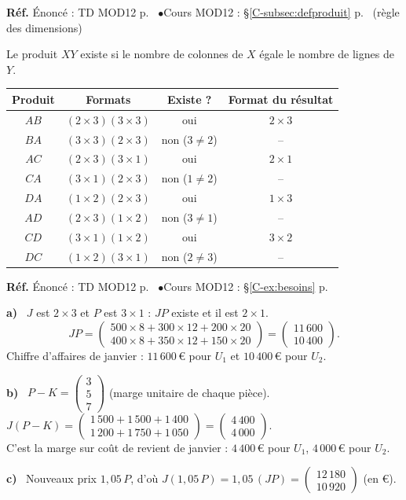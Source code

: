 \documentclass[a4paper,11pt]{article}
\newcommand{\M}[1]{\begin{pmatrix}#1\end{pmatrix}}
\newcommand{\cours}[1]{§\ref{C-#1} p.~\pageref{C-#1}}
\newcommand{\source}[2]{{\footnotesize\color{uimmgray}\textbf{Réf.} \enspace Énoncé : TD MOD12 p.~\pageref{T-#1} \enspace$\bullet$\enspace Cours MOD12 : #2}\par\smallskip}
\newcommand{\q}[1]{\textbf{\color{uimmblue}#1}\ }
\begin{document}
\begin{correction}
\source{exo:4}{\cours{subsec:defproduit} (règle des dimensions)}
Le produit $XY$ existe si le nombre de colonnes de $X$ égale le nombre de lignes de $Y$.
\begin{center}
\renewcommand{\arraystretch}{1.3}
\begin{tabular}{|c|c|c|c|}
\hline
\rowcolor{uimmlightblue}
Produit & Formats & Existe ? & Format du résultat \\
\hline
$AB$ & $(2\times 3)(3\times 3)$ & oui & $2\times 3$ \\
$BA$ & $(3\times 3)(2\times 3)$ & non ($3\neq 2$) & -- \\
$AC$ & $(2\times 3)(3\times 1)$ & oui & $2\times 1$ \\
$CA$ & $(3\times 1)(2\times 3)$ & non ($1\neq 2$) & -- \\
$DA$ & $(1\times 2)(2\times 3)$ & oui & $1\times 3$ \\
$AD$ & $(2\times 3)(1\times 2)$ & non ($3\neq 1$) & -- \\
$CD$ & $(3\times 1)(1\times 2)$ & oui & $3\times 2$ \\
$DC$ & $(1\times 2)(3\times 1)$ & non ($2\neq 3$) & -- \\
\hline
\end{tabular}
\end{center}
\end{correction}

\begin{correction}
\source{exo:5}{\cours{ex:besoins}}
\q{a)} $J$ est $2\times 3$ et $P$ est $3\times 1$ : $JP$ existe et il est $2\times 1$.
\[
JP = \M{500\times 8 + 300\times 12 + 200\times 20\\ 400\times 8 + 350\times 12 + 150\times 20} = \M{11\,600\\ 10\,400}.
\]
Chiffre d'affaires de janvier : $11\,600$\,€ pour $U_1$ et $10\,400$\,€ pour $U_2$.

\q{b)} $P - K = \M{3\\5\\7}$ (marge unitaire de chaque pièce). \quad
$J(P-K) = \M{1\,500 + 1\,500 + 1\,400\\ 1\,200 + 1\,750 + 1\,050} = \M{4\,400\\ 4\,000}$.\\
C'est la marge sur coût de revient de janvier : $4\,400$\,€ pour $U_1$, $4\,000$\,€ pour $U_2$.

\q{c)} Nouveaux prix $1{,}05\,P$, d'où $J(1{,}05\,P) = 1{,}05\,(JP) = \M{12\,180\\ 10\,920}$ (en €).
\end{correction}
\end{document}
